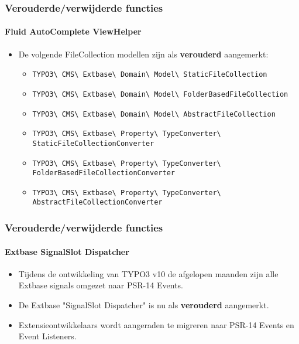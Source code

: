 \begin{frame}[fragile]
	\frametitle{Verouderde/verwijderde functies}
	\framesubtitle{Fluid AutoComplete ViewHelper}

	\begin{itemize}
		\item De volgende FileCollection modellen zijn als \textbf{verouderd} aangemerkt:
			\vspace{0.4cm}
			\begin{itemize}\tiny
				\item \texttt{TYPO3\textbackslash
					CMS\textbackslash
					Extbase\textbackslash
					Domain\textbackslash
					Model\textbackslash
					StaticFileCollection}

				\item \texttt{TYPO3\textbackslash
					CMS\textbackslash
					Extbase\textbackslash
					Domain\textbackslash
					Model\textbackslash
					FolderBasedFileCollection}

				\item \texttt{TYPO3\textbackslash
					CMS\textbackslash
					Extbase\textbackslash
					Domain\textbackslash
					Model\textbackslash
					AbstractFileCollection}

				\item \texttt{TYPO3\textbackslash
					CMS\textbackslash
					Extbase\textbackslash
					Property\textbackslash
					TypeConverter\textbackslash
					StaticFileCollectionConverter}

				\item \texttt{TYPO3\textbackslash
					CMS\textbackslash
					Extbase\textbackslash
					Property\textbackslash
					TypeConverter\textbackslash
					FolderBasedFileCollectionConverter}

				\item \texttt{TYPO3\textbackslash
					CMS\textbackslash
					Extbase\textbackslash
					Property\textbackslash
					TypeConverter\textbackslash
					AbstractFileCollectionConverter}

			\end{itemize}

	\end{itemize}

\end{frame}


\begin{frame}[fragile]
	\frametitle{Verouderde/verwijderde functies}
	\framesubtitle{Extbase SignalSlot Dispatcher}

	\begin{itemize}
		\item Tijdens de ontwikkeling van TYPO3 v10 de afgelopen maanden
			zijn alle Extbase signals omgezet naar PSR-14 Events.
		\item De Extbase "SignalSlot Dispatcher" is nu als \textbf{verouderd} aangemerkt.
		\item Extensieontwikkelaars wordt aangeraden te migreren naar PSR-14 Events en Event Listeners.
	\end{itemize}

\end{frame}

